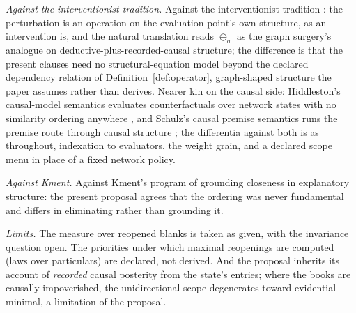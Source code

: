 \textit{Against the interventionist tradition.} Against the interventionist tradition \parencite{pearl2009}: the perturbation is an operation on the evaluation point's own structure, as an intervention is, and the natural translation reads $\ominus_\sigma$ as the graph surgery's analogue on deductive-plus-recorded-causal structure; the difference is that the present clauses need no structural-equation model beyond the declared dependency relation of Definition~\ref{def:operator}, graph-shaped structure the paper assumes rather than derives. Nearer kin on the causal side: Hiddleston's causal-model semantics evaluates counterfactuals over network states with no similarity ordering anywhere \parencite{hiddleston2005}, and Schulz's causal premise semantics runs the premise route through causal structure \parencite{schulz2011}; the differentia against both is as throughout, indexation to evaluators, the weight grain, and a declared scope menu in place of a fixed network policy.

\textit{Against Kment.} Against Kment's program \parencite*{kment2014} of grounding closeness in explanatory structure: the present proposal agrees that the ordering was never fundamental and differs in eliminating rather than grounding it.

\textit{Limits.} The measure over reopened blanks is taken as given, with the invariance question open. The priorities under which maximal reopenings are computed (laws over particulars) are declared, not derived. And the proposal inherits its account of \emph{recorded} causal posterity from the state's entries; where the books are causally impoverished, the unidirectional scope degenerates toward evidential-minimal, a limitation of the proposal.

